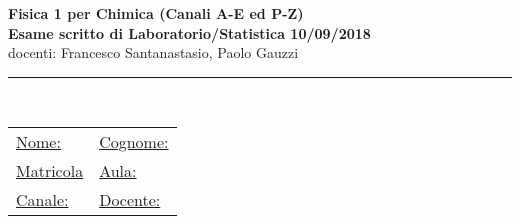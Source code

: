 \documentclass[10pt,a4paper,fleqn]{article}
\begin{document}
\pagestyle{empty}

%
%
\newsavebox{\savepar}
\newenvironment{boxit}{\begin{lrbox}{\savepar}
\begin{minipage}[b]{16.0cm}}
{\end{minipage}\end{lrbox}\fbox{\usebox{\savepar}}}
\newcommand{\myblist}[1]{\begin{list}{#1}{\setlength{\topsep}{1.8mm}
\setlength{\parskip}{0mm} \setlength{\partopsep}{0mm} \setlength{\parsep}{0mm}
\setlength{\itemsep}{0mm}}}
\newcommand{\myhfill}[1]{\hfill {\it #1} = \underline{$~~~~~~~~~~~~~~~~~~~~~~~~~~~$}}
\newcommand{\myhfiyn}[0]{\hfill $\Box$~{\sc si}~~~~~~~~$\Box$~{\sc no}}
\newcommand{\myhfild}[2]
{\hfill {\it #1}= \underline{$~~~~~~~~~~$};~ {\it #2}= \underline{$~~~~~~~~~~$}}
\newcommand{\myhfilt}[3]
{\hfill {\it #1}= \underline{$~~~~~~~~~~~~~$};~ 
{\it #2}= \underline{$~~~~~~~~~~~~~$};~{\it #3}= \underline{$~~~~~~~~~~~~~$}}
%

\setlength{\unitlength}{1mm} 
\setlength{\headheight}{0mm} %

\newcommand{\s}{\text{s}}
\newcommand{\km}{\text{km}}
\newcommand{\kg}{\text{kg}}


\vspace*{-3.5cm}
\Large
{
\begin{center}
\vspace{0.1cm}
{\bf  Fisica 1 per Chimica (Canali A-E ed P-Z)} \\
{\bf Esame scritto di Laboratorio/Statistica 10/09/2018}   \\
docenti: Francesco Santanastasio, Paolo Gauzzi
   \\
\end{center}
\noindent\rule{18cm}{0.4pt}  \\
\normalsize
%
\begin{tabular}{ll}
{\underline{Nome:}}  \hspace{6cm} & {\underline{Cognome:}} \\[0.35cm]
{\underline {Matricola}} & {\underline {Aula:}}  \\[0.35cm]
{\underline {Canale:}} & {\underline {Docente:}}
\end{tabular}
\vspace{0.5cm}
}
\small
\end{document}
